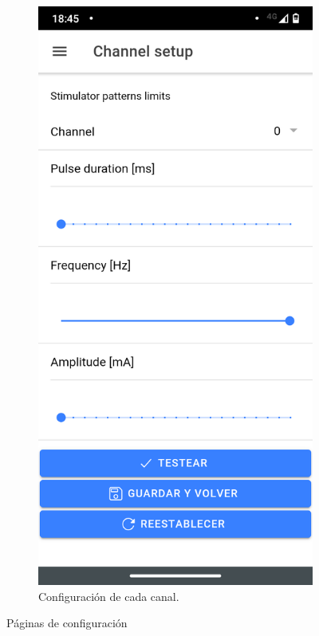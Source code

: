 \begin{figure}
\begin{subfigure}{.5\textwidth}
  \includegraphics[width=.8\linewidth]{figs/04_ch_setup.png}
  \caption{Configuración de cada canal.}
  \label{fig:ch_setup}
\end{subfigure}
\caption{Páginas de configuración}
\label{fig:config_pages}
\end{figure}


